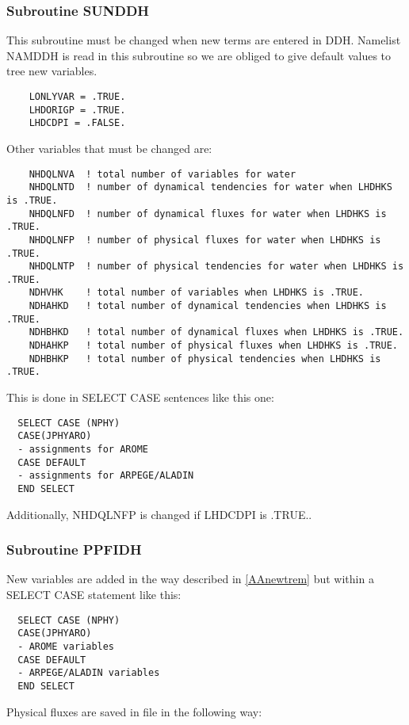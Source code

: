   \subsubsection{Subroutine SUNDDH}
  \label{sunddh}
This subroutine must be changed when new terms are entered in DDH. Namelist NAMDDH is read in this subroutine so we are obliged to give default values to tree new variables. 
    \begin{verbatim}
    LONLYVAR = .TRUE.
    LHDORIGP = .TRUE.
    LHDCDPI = .FALSE.
    \end{verbatim}

Other variables that must be changed are:
    \begin{verbatim}
    NHDQLNVA  ! total number of variables for water
    NHDQLNTD  ! number of dynamical tendencies for water when LHDHKS is .TRUE. 
    NHDQLNFD  ! number of dynamical fluxes for water when LHDHKS is .TRUE.
    NHDQLNFP  ! number of physical fluxes for water when LHDHKS is .TRUE.
    NHDQLNTP  ! number of physical tendencies for water when LHDHKS is .TRUE.
    NDHVHK    ! total number of variables when LHDHKS is .TRUE.
    NDHAHKD   ! total number of dynamical tendencies when LHDHKS is .TRUE.
    NDHBHKD   ! total number of dynamical fluxes when LHDHKS is .TRUE.  
    NDHAHKP   ! total number of physical fluxes when LHDHKS is .TRUE.
    NDHBHKP   ! total number of physical tendencies when LHDHKS is .TRUE.
    \end{verbatim}
This is done in SELECT CASE sentences like this one:
    \begin{verbatim}
  SELECT CASE (NPHY)
  CASE(JPHYARO)
  - assignments for AROME 
  CASE DEFAULT
  - assignments for ARPEGE/ALADIN
  END SELECT
    \end{verbatim}

Additionally, NHDQLNFP is changed if LHDCDPI is .TRUE..



  \subsubsection{Subroutine PPFIDH }
New variables are added in the way described in \ref{AAnewtrem} but within a SELECT CASE statement like this:
    \begin{verbatim}
  SELECT CASE (NPHY)
  CASE(JPHYARO)
  - AROME variables
  CASE DEFAULT
  - ARPEGE/ALADIN variables
  END SELECT
    \end{verbatim}

Physical fluxes are saved in file in the following way:

